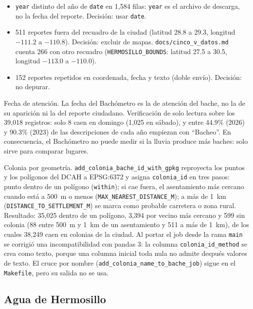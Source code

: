 \documentclass[11pt]{article}
\newcommand{\cod}[1]{\nolinkurl{#1}}
\begin{document}
\begin{itemize}
  \item \cod{year} distinto del año de \cod{date} en 1,584 filas: \cod{year} es el archivo de descarga, no la fecha del reporte. Decisión: usar \cod{date}.
  \item 511 reportes fuera del recuadro de la ciudad (latitud 28.8 a 29.3, longitud $-111.2$ a $-110.8$). Decisión: excluir de mapas. \cod{docs/cinco_v_datos.md} cuenta 266 con otro recuadro (\cod{HERMOSILLO_BOUNDS}: latitud 27.5 a 30.5, longitud $-113.0$ a $-110.0$).
  \item 152 reportes repetidos en coordenada, fecha y texto (doble envío). Decisión: no depurar.
\end{itemize}

Fecha de atención. La fecha del Bachómetro es la de atención del bache, no la de su aparición ni la del reporte ciudadano. Verificación de solo lectura sobre los 39,018 registros: solo 8 caen en domingo (1,025 en sábado), y entre 44.9\% (2026) y 90.3\% (2023) de las descripciones de cada año empiezan con ``Bacheo''. En consecuencia, el Bachómetro no puede medir si la lluvia produce más baches: solo sirve para comparar lugares.

Colonia por geometría. \cod{add_colonia_bache_id_with_gpkg} reproyecta los puntos y los polígonos del DCAH a EPSG:6372 y asigna \cod{colonia_id} en tres pasos: punto dentro de un polígono (\cod{within}); si cae fuera, el asentamiento más cercano cuando está a 500~m o menos (\cod{MAX_NEAREST_DISTANCE_M}); a más de 1~km (\cod{DISTANCE_TO_SETTLEMENT_M}) se marca como probable carretera o zona rural. Resultado: 35,025 dentro de un polígono, 3,394 por vecino más cercano y 599 sin colonia (88 entre 500~m y 1~km de un asentamiento y 511 a más de 1~km), de los cuales 38,249 caen en colonias de la ciudad. Al portar el job desde la rama \cod{main} se corrigió una incompatibilidad con pandas 3: la columna \cod{colonia_id_method} se crea como texto, porque una columna inicial toda nula no admite después valores de texto. El cruce por nombre (\cod{add_colonia_name_to_bache_job}) sigue en el \cod{Makefile}, pero su salida no se usa.

\subsection{Agua de Hermosillo}
\end{document}
